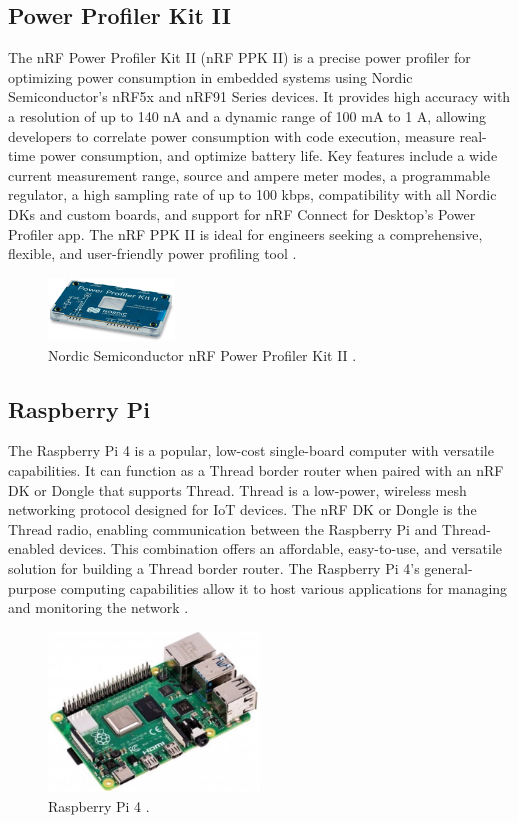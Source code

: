 \subsection{Power Profiler Kit II}
The nRF Power Profiler Kit II (nRF PPK II) is a precise power profiler for optimizing power consumption in embedded systems using Nordic Semiconductor's nRF5x and nRF91 Series devices. It provides high accuracy with a resolution of up to 140 nA and a dynamic range of 100 mA to 1 A, allowing developers to correlate power consumption with code execution, measure real-time power consumption, and optimize battery life. Key features include a wide current measurement range, source and ampere meter modes, a programmable regulator, a high sampling rate of up to 100 kbps, compatibility with all Nordic DKs and custom boards, and support for nRF Connect for Desktop's Power Profiler app. The nRF PPK II is ideal for engineers seeking a comprehensive, flexible, and user-friendly power profiling tool \cite{Semiconductor_Nordic_PPK_II_2018_1.0}.

\begin{figure}[!htb]
    \centering
    \includegraphics[width=0.3\textwidth]{images/situational_theoretical_analysis/nRF_Power_Profiler_Kit_II.png}
    \caption{Nordic Semiconductor nRF Power Profiler Kit II \cite{Semiconductor_Nordic_PPK_II_2018_1.0}.}
    \label{fig:nRF_Power_Profiler_Kit_II}
\end{figure}

\subsection{Raspberry Pi}
The Raspberry Pi 4 is a popular, low-cost single-board computer with versatile capabilities. It can function as a Thread border router when paired with an nRF DK or Dongle that supports Thread. Thread is a low-power, wireless mesh networking protocol designed for IoT devices. The nRF DK or Dongle is the Thread radio, enabling communication between the Raspberry Pi and Thread-enabled devices. This combination offers an affordable, easy-to-use, and versatile solution for building a Thread border router. The Raspberry Pi 4's general-purpose computing capabilities allow it to host various applications for managing and monitoring the network \cite{alm2019internet}.

\begin{figure}[!htb]
    \centering
    \includegraphics[width=0.5\textwidth]{images/situational_theoretical_analysis/Raspberry_Pi_4.jpg}
    \caption{Raspberry Pi 4 \cite{Pi_Raspberry_Pi_4_Model_B_2019_1.0}.}
    \label{fig:Raspberry_Pi_4}
\end{figure}
